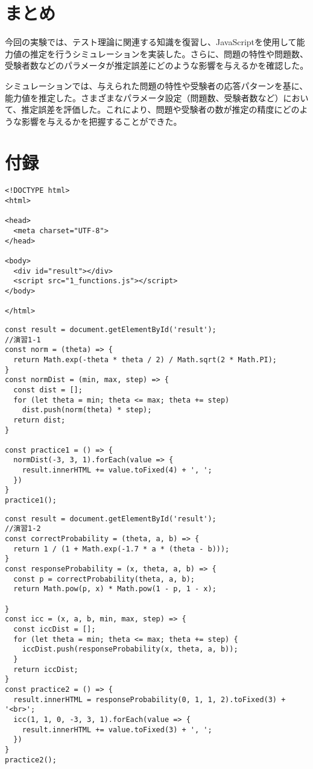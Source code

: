 \documentclass[12pt]{jarticle}
\begin{document}
\section{まとめ}
今回の実験では、テスト理論に関連する知識を復習し、JavaScriptを使用して能力値の推定を行うシミュレーションを実装した。さらに、問題の特性や問題数、受験者数などのパラメータが推定誤差にどのような影響を与えるかを確認した。

シミュレーションでは、与えられた問題の特性や受験者の応答パターンを基に、能力値を推定した。さまざまなパラメータ設定（問題数、受験者数など）において、推定誤差を評価した。これにより、問題や受験者の数が推定の精度にどのような影響を与えるかを把握することができた。

\clearpage
\appendix
\section{付録}
\begin{lstlisting}[style=HTML, caption={1\_index.html}]
<!DOCTYPE html>
<html>

<head>
  <meta charset="UTF-8">
</head>

<body>
  <div id="result"></div>
  <script src="1_functions.js"></script>
</body>

</html>
\end{lstlisting}
\begin{lstlisting}[style=JavaScript, caption={演習1-1}]
const result = document.getElementById('result');
//演習1-1
const norm = (theta) => {
  return Math.exp(-theta * theta / 2) / Math.sqrt(2 * Math.PI);
}
const normDist = (min, max, step) => {
  const dist = [];
  for (let theta = min; theta <= max; theta += step)
    dist.push(norm(theta) * step);
  return dist;
}

const practice1 = () => {
  normDist(-3, 3, 1).forEach(value => {
    result.innerHTML += value.toFixed(4) + ', ';
  })
}
practice1();
\end{lstlisting}
\begin{lstlisting}[style=JavaScript, caption={演習1-2}]
const result = document.getElementById('result');
//演習1-2
const correctProbability = (theta, a, b) => {
  return 1 / (1 + Math.exp(-1.7 * a * (theta - b)));
}
const responseProbability = (x, theta, a, b) => {
  const p = correctProbability(theta, a, b);
  return Math.pow(p, x) * Math.pow(1 - p, 1 - x);

}
const icc = (x, a, b, min, max, step) => {
  const iccDist = [];
  for (let theta = min; theta <= max; theta += step) {
    iccDist.push(responseProbability(x, theta, a, b));
  }
  return iccDist;
}
const practice2 = () => {
  result.innerHTML = responseProbability(0, 1, 1, 2).toFixed(3) + '<br>';
  icc(1, 1, 0, -3, 3, 1).forEach(value => {
    result.innerHTML += value.toFixed(3) + ', ';
  })
}
practice2();
\end{lstlisting}
\end{document}
